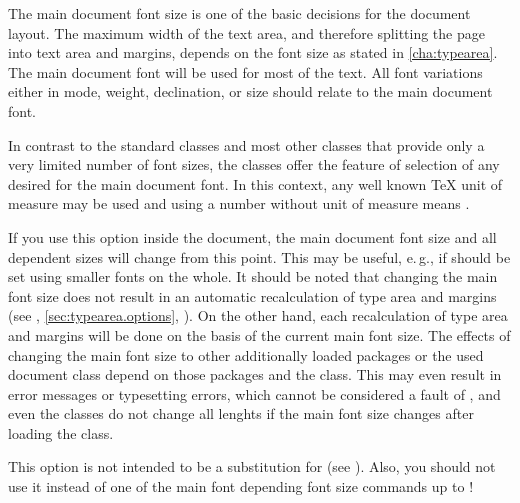 The main document font size is one of the basic decisions for the document
layout. The maximum width of the text area, and therefore splitting the page
into text area and margins, depends on the font size as stated in
\autoref{cha:typearea}. The main document font will be used for most 
of the text. All font variations either in mode, weight, declination, or size
should relate to the main document font.


\begin{Declaration}
\end{Declaration}
%
In contrast to the standard classes and most other classes that provide only
a very limited number of font sizes, the \KOMAScript{} classes offer the
feature of selection of any desired  for the main document
font. In this context, any well known \TeX{} unit of measure may be used and
using a number without unit of measure means .

If you use this option inside the document, the main document font size and
all dependent sizes will change from this point. This may be useful, e.\,g.,
if %
%
%
should be set using smaller fonts on the whole. It should be noted that
changing the main font size does not result in an automatic recalculation of
type area and margins (see ,
\autoref{sec:typearea.options},
). On the other hand, each
recalculation of type area and margins will be done on the basis of the
current main font size. The effects of changing the main font size to other
additionally loaded packages or the used document class depend on those
packages and the class. This may even result in error messages or typesetting
errors, which cannot be considered a fault of \KOMAScript, and even the
\KOMAScript{} classes do not change all lenghts if the main font size
changes after loading the class.

This option is not intended to be a substitution for
 (see \cite{latex:fntguide}). Also, you should not use it
instead of one of the main font depending font size commands  up
to !%

\fi  %


